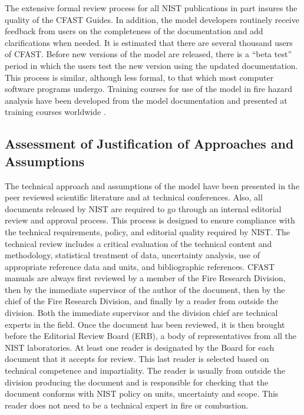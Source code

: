 The extensive formal review process for all NIST publications in part insures the quality of the CFAST Guides. In addition, the model developers routinely receive feedback from users on the completeness of the documentation and add clarifications when needed. It is estimated that there are several thousand users of CFAST. Before new versions of the model are released, there is a ``beta test'' period in which the users test the new version using the updated documentation. This process is similar, although less formal, to that which most computer software programs undergo. Training courses for use of the model in fire hazard analysis have been developed from the model documentation and presented at training courses worldwide \cite{Barnett:1990}.

\subsection{Assessment of Justification of Approaches and Assumptions}

The technical approach and assumptions of the model have been presented in the peer reviewed scientific literature and at technical conferences. Also, all documents released by NIST are required to go through an internal editorial review and approval process. This process is designed to ensure compliance with the technical requirements, policy, and editorial quality required by NIST. The technical review includes a critical evaluation of the technical content and methodology, statistical treatment of data, uncertainty analysis, use of appropriate reference data and units, and bibliographic references. CFAST manuals are always first reviewed by a member of the Fire Research Division, then by the immediate supervisor of the author of the document, then by the chief of the Fire Research Division, and finally by a reader from outside the division. Both the immediate supervisor and the division chief are technical experts in the field. Once the document has been reviewed, it is then brought before the Editorial Review Board (ERB), a body of representatives from all the NIST laboratories. At least one reader is designated by the Board for each document that it accepts for review. This last reader is selected based on technical competence and impartiality. The reader is usually from outside the division producing the document and is responsible for checking that the document conforms with NIST policy on units, uncertainty and scope. This reader does not need to be a technical expert in fire or combustion.

